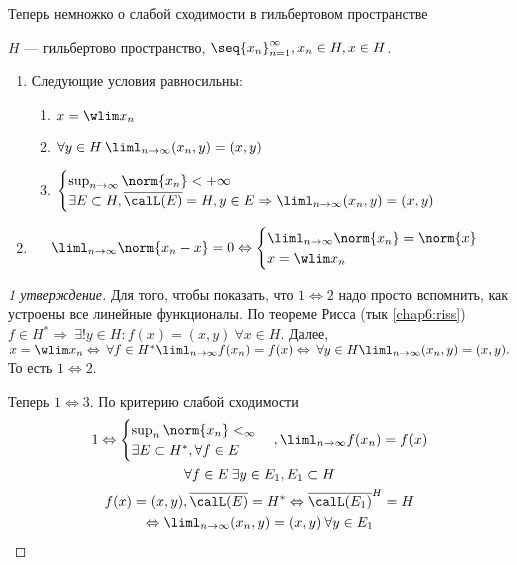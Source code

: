 \documentclass[document]{subfiles}
\begin{document}
Теперь немножко о слабой сходимости в гильбертовом пространстве

\begin{theorem}
    $H$ --- гильбертово пространство, $\seq{x_n}^\infty_{n=1}, x_n \in H, x \in H$.
    \begin{enumerate}
        \item Следующие условия равносильны:
        \begin{enumerate}
            \item $x = \wlim x_n$ 
            \item $\forall y \in H \: \liml_{n \to \infty} (x_n, y) = (x,y)$
            \item $\begin{cases}
                \sup_{n \to \infty} \norm{x_n} < +\infty \\
                \exists E \subset H, \overline{\calL(E)} = H, y \in E \Rightarrow \liml_{n \to \infty} (x_n, y) = (x,y)
            \end{cases}$
        \end{enumerate}
        \item \[\liml_{n \to \infty} \norm{x_n - x} = 0 \Leftrightarrow \begin{cases}
            \liml_{n \to \infty} \norm{x_n} = \norm{x} \\
            x = \wlim x_n
        \end{cases}  \]
    \end{enumerate}
\end{theorem}

\begin{proof}[1 утверждение]
    Для того, чтобы показать, что $1 \Leftrightarrow 2$ надо просто вспомнить, как устроены все линейные функционалы. 
    По теореме Рисса (тык \ref{chap6:riss})  $f \in H^* \Rightarrow \: \exists! y \in H : f(x) = (x,y) \: \forall x \in H$. Далее,
    $x = \wlim x_n \Leftrightarrow \: \forall f \in H^* \liml_{n \to \infty} f(x_n) = f(x) \Leftrightarrow \: \forall y \in H \liml_{n \to \infty} (x_n,y) = (x,y).$
    То есть $1 \Leftrightarrow 2$. 

    Теперь $1 \Leftrightarrow 3$. По критерию слабой сходимости 
    \begin{gather*}
        1 \Leftrightarrow \begin{cases}
            \sup_n \norm{x_n} < _\infty \\
            \exists E \subset H^*, \forall f \in E
        \end{cases}, \liml_{n \to \infty} f(x_n) = f(x) \\
        \forall f \in E \: \exists y \in E_1, E_1 \subset H \\
        f(x) = (x,y), \overline{\calL(E)} = H^* \Leftrightarrow \overline{\calL(E_1)}^H = H \\
        \Leftrightarrow \liml_{n \to \infty} (x_n, y) = (x,y) \: \forall y \in E_1
    \end{gather*}
\end{proof}
\end{document}
